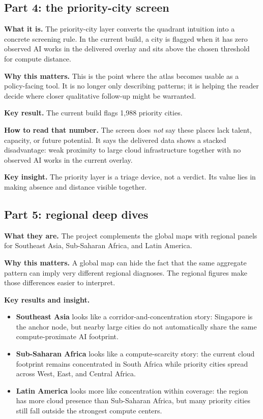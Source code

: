 \documentclass[11pt]{article}
\begin{document}
\subsection{Part 4: the priority-city screen}
\textbf{What it is.} The priority-city layer converts the quadrant intuition into a concrete screening rule. In the current build, a city is flagged when it has zero observed AI works in the delivered overlay and sits above the chosen threshold for compute distance.

\textbf{Why this matters.} This is the point where the atlas becomes usable as a policy-facing tool. It is no longer only describing patterns; it is helping the reader decide where closer qualitative follow-up might be warranted.

\textbf{Key result.} The current build flags 1{,}988 priority cities.

\textbf{How to read that number.} The screen does \emph{not} say these places lack talent, capacity, or future potential. It says the delivered data shows a stacked disadvantage: weak proximity to large cloud infrastructure together with no observed AI works in the current overlay.

\textbf{Key insight.} The priority layer is a triage device, not a verdict. Its value lies in making absence and distance visible together.

\subsection{Part 5: regional deep dives}
\textbf{What they are.} The project complements the global maps with regional panels for Southeast Asia, Sub-Saharan Africa, and Latin America.

\textbf{Why this matters.} A global map can hide the fact that the same aggregate pattern can imply very different regional diagnoses. The regional figures make those differences easier to interpret.

\textbf{Key results and insight.}
\begin{itemize}[leftmargin=*]
    \item \textbf{Southeast Asia} looks like a corridor-and-concentration story: Singapore is the anchor node, but nearby large cities do not automatically share the same compute-proximate AI footprint.
    \item \textbf{Sub-Saharan Africa} looks like a compute-scarcity story: the current cloud footprint remains concentrated in South Africa while priority cities spread across West, East, and Central Africa.
    \item \textbf{Latin America} looks more like concentration within coverage: the region has more cloud presence than Sub-Saharan Africa, but many priority cities still fall outside the strongest compute centers.
\end{itemize}
\end{document}
